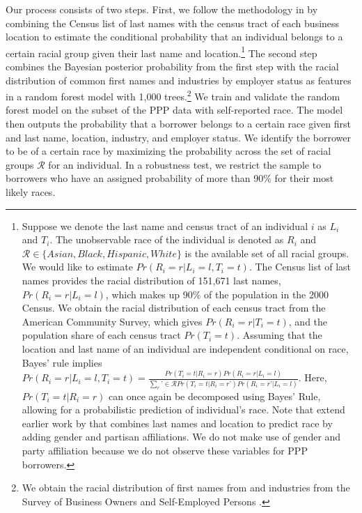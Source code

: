 \documentclass[11pt]{article}
\begin{document}
Our process consists of two steps. First, we follow the methodology in \citet{Imai2016} by combining the Census list of last names \citep{word2008demographic} with the census tract of each business location to estimate the conditional probability that an individual belongs to a certain racial group given their last name and location.\footnote{Suppose we denote the last name and census tract of an individual $i$ as $L_i$ and $T_i$. The unobservable race of the individual is denoted as $R_i$ and $\mathcal{R} \in \{Asian, Black, Hispanic, White\}$ is the available set of all racial groups. We would like to estimate $Pr(R_i = r| L_i=l, T_i=t)$. The Census list of last names provides the racial distribution of 151,671 last names, $Pr(R_i=r|L_i=l)$, which makes up 90\% of the population in the 2000 Census. We obtain the racial distribution of each census tract from the American Community Survey, which gives $Pr(R_i=r|T_i=t)$, and the population share of each census tract $Pr(T_i=t)$. Assuming that the location and last name of an individual are independent conditional on race, Bayes’ rule implies $Pr(R_i=r|L_i=l, T_i=t) = \frac{Pr(T_i=t|R_i=r)Pr(R_i=r|L_i=l)}{\sum_r’ \in \mathcal{R} Pr(T_i = t | R_i=r’)Pr(R_i=r’|L_i=l)}$. Here, $Pr(T_i=t|R_i=r)$ can once again be decomposed using Bayes’ Rule, allowing for a probabilistic prediction of individual’s race.  Note that \citet{Imai2016} extend earlier work by \citet{elliott2008new, elliott2009using} that combines last names and location to predict race by adding gender and partisan affiliations. We do not make use of gender and party affiliation because we do not observe these variables for PPP borrowers.} The second step combines the Bayesian posterior probability from the first step with the racial distribution of common first names and industries by employer status as features in a random forest model with 1,000 trees.\footnote{We obtain the racial distribution of first names from \cite{tzioumis2018demographic} and industries from the Survey of Business Owners and Self-Employed Persons \citep{sbo2012}.} We train and validate the random forest model on the subset of the PPP data with self-reported race. The model then outputs the probability that a borrower belongs to a certain race given first and last name, location, industry, and employer status. We identify the borrower to be of a certain race by maximizing the probability across the set of racial groups $\mathcal{R}$ for an individual. In a robustness test, we restrict the sample to borrowers who have an assigned probability of more than 90\% for their most likely races.
\end{document}
